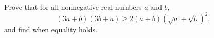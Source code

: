 Prove that for all nonnegative real numbers $a$ and $b$,
\[
(3a+b)(3b+a)\ge2(a+b)\left(\sqrt a+\sqrt b\right)^2 ,
\]
and find when equality holds.
